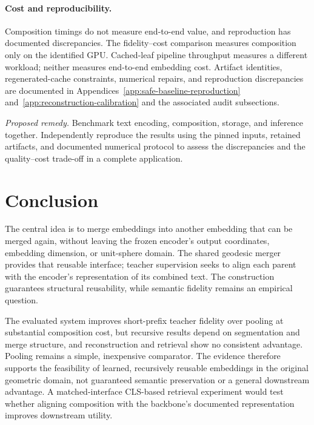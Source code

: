 \documentclass[10pt]{article}
\begin{document}
\paragraph{Cost and reproducibility.}
Composition timings do not measure end-to-end value, and reproduction has documented discrepancies.
The fidelity--cost comparison measures composition only on the identified
GPU. Cached-leaf pipeline throughput measures a different workload; neither
measures end-to-end embedding cost. 
Artifact identities, regenerated-cache constraints, numerical repairs, and
reproduction discrepancies are documented in
Appendices~\ref{app:safe-baseline-reproduction}
and~\ref{app:reconstruction-calibration} and the associated audit subsections.

\emph{Proposed remedy.} Benchmark text encoding, composition, storage,
and inference together. Independently reproduce the results using the pinned
inputs, retained artifacts, and documented numerical protocol to assess the
discrepancies and the quality--cost trade-off in a complete application.

\section{Conclusion}
\label{sec:conclusion}

The central idea is to merge embeddings into another embedding that can be
merged again, without leaving the frozen encoder's output coordinates,
embedding dimension, or unit-sphere domain. The shared geodesic merger provides
that reusable interface; teacher supervision seeks to align each parent with
the encoder's representation of its combined text. The construction guarantees
structural reusability, while semantic fidelity remains an empirical question.

The evaluated system improves short-prefix teacher fidelity over pooling at
substantial composition cost, but recursive results depend on segmentation
and merge structure, and reconstruction and retrieval show no consistent
advantage. Pooling remains a simple, inexpensive comparator. The evidence
therefore supports the feasibility of
learned, recursively reusable embeddings in the original geometric domain,
not guaranteed semantic preservation or a general downstream advantage.
A matched-interface CLS-based retrieval experiment would test whether aligning
composition with the backbone's documented representation improves downstream utility.

\ifdefined\papreprint

\else

\fi

\clearpage
\end{document}

